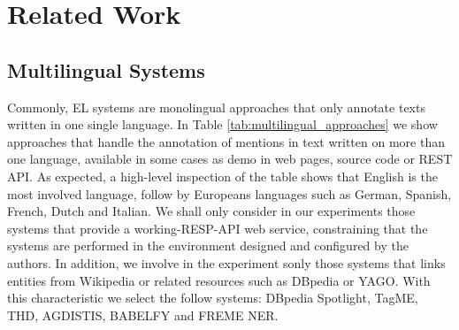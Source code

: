 \documentclass{llncs}
\begin{document}
%
\section{Related Work}
\label{sec:relatedWork}

\subsection{Multilingual Systems}
Commonly, EL systems are monolingual approaches that only annotate texts written in one single language. In Table \ref{tab:multilingual_approaches} we show approaches that handle the annotation of mentions in text written on more than one language, available in some cases as demo in web pages, source code or REST API. As expected, a high-level inspection of the table shows that English is the most involved language, follow by Europeans languages such as German, Spanish, French, Dutch and Italian. We shall only consider in our experiments those systems that provide a working-RESP-API web service, constraining that the systems are performed in the environment designed and configured by the authors. In addition, we involve in the experiment sonly those systems that links entities from Wikipedia or related resources such  as  DBpedia or YAGO. With this characteristic we select the follow systems: DBpedia Spotlight, TagME, THD, AGDISTIS, BABELFY and FREME NER. 
\end{document}
